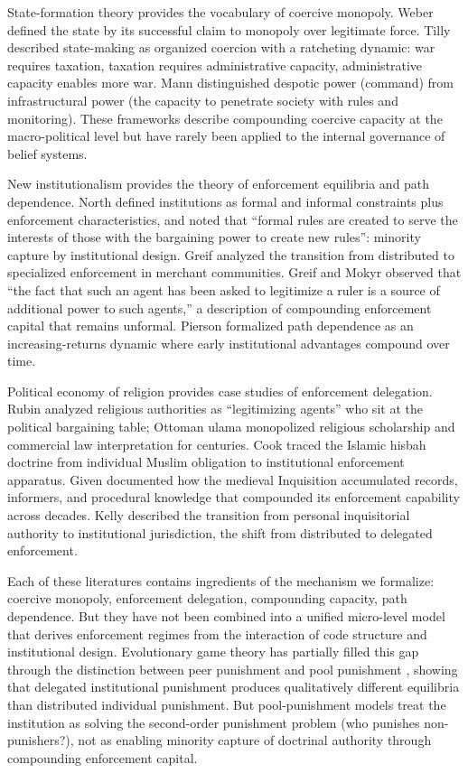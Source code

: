 \documentclass[12pt]{article}
\begin{document}
State-formation theory provides the vocabulary of coercive monopoly. Weber \cite{weber1946} defined the state by its successful claim to monopoly over legitimate force. Tilly \cite{tilly1985} described state-making as organized coercion with a ratcheting dynamic: war requires taxation, taxation requires administrative capacity, administrative capacity enables more war. Mann \cite{mann1986} distinguished despotic power (command) from infrastructural power (the capacity to penetrate society with rules and monitoring). These frameworks describe compounding coercive capacity at the macro-political level but have rarely been applied to the internal governance of belief systems.

New institutionalism provides the theory of enforcement equilibria and path dependence. North \cite{north1990} defined institutions as formal and informal constraints plus enforcement characteristics, and noted that ``formal rules are created to serve the interests of those with the bargaining power to create new rules'': minority capture by institutional design. Greif \cite{greif2006} analyzed the transition from distributed to specialized enforcement in merchant communities. Greif and Mokyr \cite{greif2016} observed that ``the fact that such an agent has been asked to legitimize a ruler is a source of additional power to such agents,'' a description of compounding enforcement capital that remains unformal. Pierson \cite{pierson2000} formalized path dependence as an increasing-returns dynamic where early institutional advantages compound over time.

Political economy of religion provides case studies of enforcement delegation. Rubin \cite{rubin2017} analyzed religious authorities as ``legitimizing agents'' who sit at the political bargaining table; Ottoman ulama monopolized religious scholarship and commercial law interpretation for centuries. Cook \cite{cook2000} traced the Islamic hisbah doctrine from individual Muslim obligation to institutional enforcement apparatus. Given \cite{given1997} documented how the medieval Inquisition accumulated records, informers, and procedural knowledge that compounded its enforcement capability across decades. Kelly \cite{kelly1989} described the transition from personal inquisitorial authority to institutional jurisdiction, the shift from distributed to delegated enforcement.

Each of these literatures contains ingredients of the mechanism we formalize: coercive monopoly, enforcement delegation, compounding capacity, path dependence. But they have not been combined into a unified micro-level model that derives enforcement regimes from the interaction of code structure and institutional design. Evolutionary game theory has partially filled this gap through the distinction between peer punishment and pool punishment \cite{hilbe2014,sigmund2010}, showing that delegated institutional punishment produces qualitatively different equilibria than distributed individual punishment. But pool-punishment models treat the institution as solving the second-order punishment problem (who punishes non-punishers?), not as enabling minority capture of doctrinal authority through compounding enforcement capital.
\end{document}
